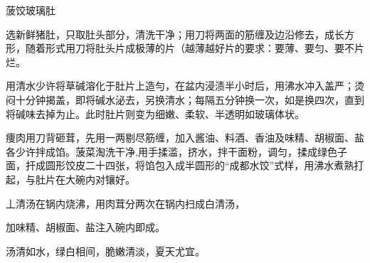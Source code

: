 \begin{recipe}{菠饺玻璃肚}

\ingredients


\cooking

\step 选新鲜猪肚，只取肚头部分，清洗干净；用刀将两面的筋缠及边沿修去，成长方形，随着形式用刀将肚头片成极薄的片（越薄越好片的要求：要薄、要匀、要不片烂。

\step 用清水少许将草碱溶化于肚片上造勻，在盆内浸渍半小时后，用沸水冲入盖严；烫闷十分钟揭盖，即将碱水泌去，另换清水；每隔五分钟换一次，如是换四次，直到将碱味去掉为止。此时肚片则变为细嫩、柔软、半透明如玻璃体状。

\step 痩肉用刀背砸茸，先用一两剔尽筋缠，加入酱油、料酒、香油及味精、胡椒面、盐各少许拌成馅。菠菜淘洗干净,用手揉滥，挤水，拌干面粉，调匀，揉成绿色子面，扞成圆形饺皮二十四张，将馅包入成半圆形的“成都水饺”式样，用沸水煮熟打起，与肚片在大碗内对镶好。

丄清汤在锅内烧沸，用肉茸分两次在锅内扫成白清汤，

加味精、胡椒面、盐注入碗内即成。

\notes

汤清如水，绿白相间，脆嫩清淡，夏天尤宜。

\end{recipe}

